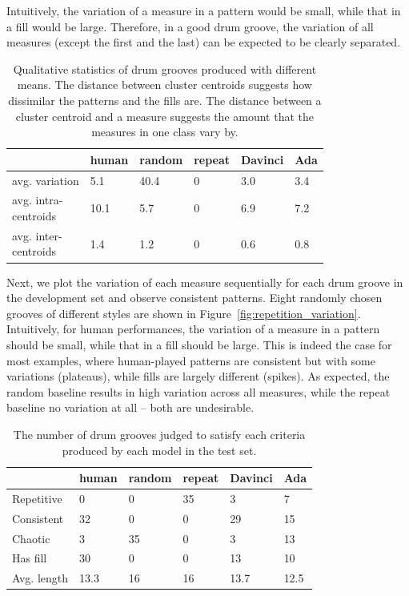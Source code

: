 \documentclass[letterpaper]{article} %
\begin{document}
Intuitively, the variation of a measure in a pattern would be small, while that in a fill would be large. Therefore, in a good drum groove, the variation of all measures (except the first and the last) can be expected to be clearly separated.

\begin{table}[t!]
\small
\centering
\begin{tabular}{llllll}
\toprule
            & human & random & repeat & Davinci & Ada \\ \midrule
avg. variation   &  5.1  &  40.4 & 0  & 3.0  &  3.4   \\
\makecell[l]{avg. intra- \\ centroids}   &  10.1  &  5.7 & 0  & 6.9  &  7.2   \\
\makecell[l]{avg. inter- \\ centroids}   &  1.4  &  1.2 & 0  & 0.6  &  0.8   \\
\bottomrule
\end{tabular}
\caption{Qualitative statistics of drum grooves produced with different means. The distance between cluster centroids
 suggests how dissimilar the patterns and the fills are. The distance between a cluster centroid and a measure suggests the amount that the measures in one class vary by.}
\label{tab:variation}
\end{table}

Next, we plot the variation of each measure sequentially for each drum groove in the development set and observe consistent patterns. Eight randomly chosen grooves of different styles are shown in Figure~\ref{fig:repetition_variation}. Intuitively, for human performances, the variation of a measure in a pattern should be small, while that in a fill should be large. This is indeed the case for most examples, where human-played patterns are consistent but with some variations (plateaus), while fills are largely different (spikes). As expected, the random baseline results in high variation across all measures, while the repeat baseline no variation at all -- both are undesirable.

\begin{table}[t!]
\small
\centering
\begin{tabular}{llllll}
\toprule
            & human & random & repeat & Davinci & Ada \\ \midrule
Repetitive   &  0  &  0 & 35  & 3  &  7   \\
Consistent   &  32  &  0 & 0  & 29  &  15   \\
Chaotic   &  3  &  35 & 0  & 3  &  13   \\
Has fill   &  30  &  0  & 0  &  13  &  10  \\
Avg. length   &  13.3  &   16  & 16  &  13.7  &  12.5  \\
\bottomrule
\end{tabular}
\caption{The number of drum grooves judged to satisfy each criteria produced by each model in the test set.}
\label{tab:subjective}
\end{table}
\end{document}

